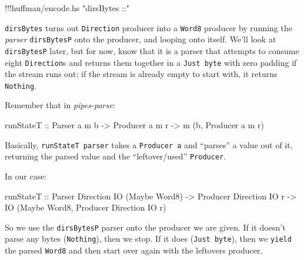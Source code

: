 \documentclass[]{article}
\newenvironment{Shaded}{}{}
\newcommand{\DataTypeTok}[1]{\textcolor[rgb]{0.56,0.13,0.00}{{#1}}}
\newcommand{\StringTok}[1]{\textcolor[rgb]{0.25,0.44,0.63}{{#1}}}
\newcommand{\OtherTok}[1]{\textcolor[rgb]{0.00,0.44,0.13}{{#1}}}
\newcommand{\FunctionTok}[1]{\textcolor[rgb]{0.02,0.16,0.49}{{#1}}}
\newcommand{\NormalTok}[1]{{#1}}
\begin{document}
\begin{Shaded}
\begin{Highlighting}[]
\FunctionTok{!!!}\NormalTok{huffman}\FunctionTok{/}\NormalTok{encode}\FunctionTok{.}\NormalTok{hs }\StringTok{"dirsBytes ::"}
\end{Highlighting}
\end{Shaded}

\texttt{dirsBytes} turns out \texttt{Direction} producer into a
\texttt{Word8} producer by running the \emph{parser} \texttt{dirsBytesP}
onto the producer, and looping onto itself. We'll look at
\texttt{dirsBytesP} later, but for now, know that it is a parser that
attempts to consume eight \texttt{Direction}s and returns them together
in a \texttt{Just\ byte} with zero padding if the stream runs out; if
the stream is already empty to start with, it returns \texttt{Nothing}.

Remember that in \emph{pipes-parse}:

\begin{Shaded}
\begin{Highlighting}[]
\OtherTok{runStateT ::} \DataTypeTok{Parser} \NormalTok{a m b }\OtherTok{->} \DataTypeTok{Producer} \NormalTok{a m r }\OtherTok{->} \NormalTok{m (b, }\DataTypeTok{Producer} \NormalTok{a m r)}
\end{Highlighting}
\end{Shaded}

Basically, \texttt{runStateT\ parser} takes a \texttt{Producer\ a} and
``parses'' a value out of it, returning the parsed value and the
``leftover/used'' \texttt{Producer}.

In our case:

\begin{Shaded}
\begin{Highlighting}[]
\OtherTok{runStateT ::} \DataTypeTok{Parser}   \DataTypeTok{Direction} \DataTypeTok{IO} \NormalTok{(}\DataTypeTok{Maybe} \DataTypeTok{Word8}\NormalTok{)}
          \OtherTok{->} \DataTypeTok{Producer} \DataTypeTok{Direction} \DataTypeTok{IO} \NormalTok{r}
          \OtherTok{->} \DataTypeTok{IO} \NormalTok{(}\DataTypeTok{Maybe} \DataTypeTok{Word8}\NormalTok{, }\DataTypeTok{Producer} \DataTypeTok{Direction} \DataTypeTok{IO} \NormalTok{r)}
\end{Highlighting}
\end{Shaded}

So we use the \texttt{dirsBytesP} parser onto the producer we are given.
If it doesn't parse any bytes (\texttt{Nothing}), then we stop. If it
does (\texttt{Just\ byte}), then we \texttt{yield} the parsed
\texttt{Word8} and then start over again with the leftovers producer.
\end{document}
